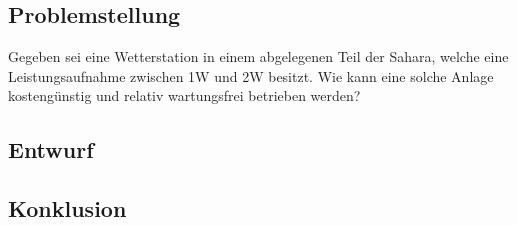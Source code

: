 \subsection{Problemstellung}
    Gegeben sei eine Wetterstation in einem abgelegenen Teil der Sahara,
    welche eine Leistungsaufnahme zwischen 1W und 2W besitzt. Wie kann
    eine solche Anlage kostengünstig und relativ wartungsfrei betrieben
    werden?
\subsection{Entwurf}
\subsection{Konklusion}